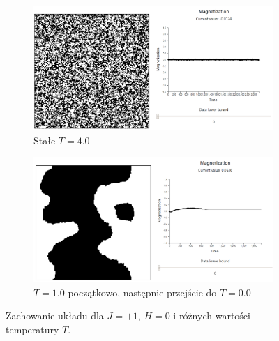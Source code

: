\documentclass[11pt] {article}
\begin{document}
\begin{figure}[H]
\begin{subfigure}{.48\textwidth}
\end{subfigure}
\begin{subfigure}{.48\textwidth}
  \centering
  \includegraphics[width=0.9\linewidth]{res/T_4.png}
  \caption{Stałe $T = 4.0$}
  \label{fig:T4}
\end{subfigure}
\begin{subfigure}{.48\textwidth}
  \centering
  \includegraphics[width=0.9\linewidth]{res/T_0.png}
  \caption{$T = 1.0$ początkowo, następnie przejście do $T = 0.0$}
  \label{fig:T0}
\end{subfigure}
\caption{Zachowanie układu dla $J = +1$, $H = 0$ i różnych wartości temperatury $T$.}
\label{fig:T}
\end{figure}
\end{document}
